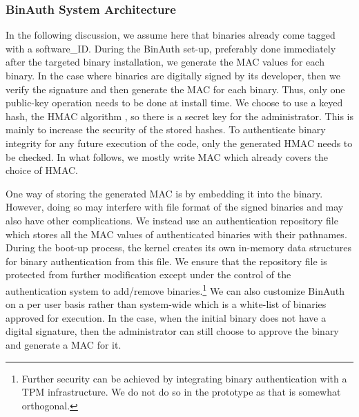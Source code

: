 \subsubsection{BinAuth System Architecture}



In the following discussion, we assume here that binaries already come 
tagged with a software\_ID. 
During the BinAuth set-up, preferably done immediately after 
the targeted binary installation, we generate the MAC values for each binary.
In the case where binaries are digitally signed by its developer,
then we verify the signature and then generate the MAC for each binary.
Thus, only one public-key operation needs to be done at install time.
We choose to use a keyed hash, the HMAC algorithm \cite{krawczyk1997rfc2104},
so there is a secret key for the administrator. This is mainly to increase
the security of the stored hashes.
To authenticate binary integrity for any future execution of the code,
only the generated HMAC needs to be checked.
In what follows, we mostly write MAC which already covers the choice of HMAC.

One way of storing the generated MAC is by embedding it into the binary.
However, doing so may interfere with file format of the signed binaries
and may also have other complications. 
We instead use an authentication repository file
which stores all the MAC values of authenticated binaries
with their pathnames.
During the boot-up process, the kernel creates its own in-memory data structures
for binary authentication from this file. 
We ensure that the repository file is protected from further modification
except under the control of the authentication system to 
add/remove binaries.\footnote{
Further security can be achieved by integrating binary authentication
with a TPM infrastructure. We do not do so in the prototype as that is
somewhat orthogonal.
}
We can also customize BinAuth on a per user basis rather
than system-wide which is a white-list of
binaries approved for execution.
In the case, when the initial binary does not have a digital signature, then
the administrator can still choose to approve the binary and generate a MAC
for it.

